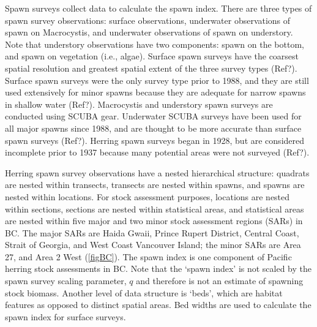 \documentclass[12pt]{article}
\begin{document}
Spawn surveys collect data to calculate the spawn index.
There are three types of spawn survey observations: surface observations, underwater observations of spawn on Macrocystis, and underwater observations of spawn on understory.
Note that understory observations have two components: spawn on the bottom, and spawn on vegetation (i.e., algae).
Surface spawn surveys have the coarsest spatial resolution and greatest spatial extent of the three survey types (Ref?).
Surface spawn surveys were the only survey type prior to 1988, and they are still used extensively for minor spawns because they are adequate for narrow spawns in shallow water (Ref?).
Macrocystis and understory spawn surveys are conducted using SCUBA gear.
Underwater SCUBA surveys have been used for all major spawns since 1988, and are thought to be more accurate than surface spawn surveys (Ref?).
Herring spawn surveys began in 1928, but are considered incomplete prior to 1937 because many potential areas were not surveyed (Ref?).

Herring spawn survey observations have a nested hierarchical structure: quadrats are nested within transects, transects are nested within spawns, and spawns are nested within locations.
For stock assessment purposes, locations are nested within sections, sections are nested within statistical areas, and statistical areas are nested within five major and two minor stock assessment regions (SARs) in BC.
The major SARs are Haida Gwaii, Prince Rupert District, Central Coast, Strait of Georgia, and West Coast Vancouver Island; the minor SARs are Area 27, and Area 2 West (\autoref{figBC}).
The spawn index is one component of Pacific herring stock assessments in BC.
Note that the `spawn index' is not scaled by the spawn survey scaling parameter, $q$ \citeyearpar[CSAS][]{CSAS2015b} and therefore is not an estimate of spawning stock biomass.
Another level of data structure is `beds', which are habitat features as opposed to distinct spatial areas.
Bed widths are used to calculate the spawn index for surface surveys.
\end{document}
